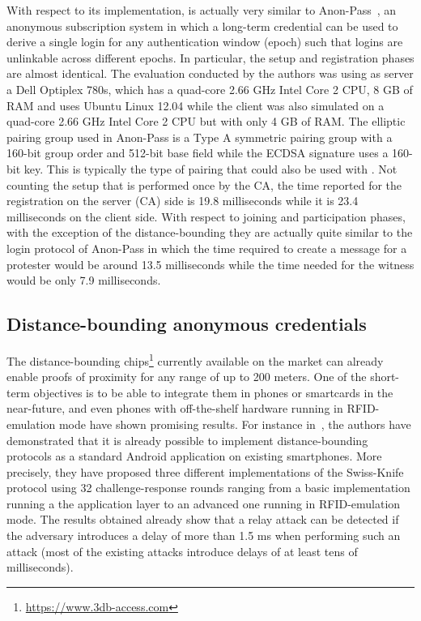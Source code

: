 With respect to its implementation, \CROCUS is actually very similar to Anon-Pass~\cite{AnonPass}, an anonymous subscription system in which a long-term credential can be used to derive a single login for any authentication window (\ie epoch) such that logins are unlinkable across different epochs. 
In particular, the setup and registration phases are almost identical. 
The evaluation conducted by the authors was using as server a Dell Optiplex 780s, which has a quad-core 2.66 GHz Intel Core 2 CPU, 8 GB of RAM and uses Ubuntu Linux 12.04 while the client was also simulated on a quad-core 2.66 GHz Intel Core 2 CPU but with only 4 GB of RAM.
The elliptic pairing group used in Anon-Pass is a Type A symmetric pairing group with a 160-bit group order and 512-bit base field while the ECDSA signature uses a 160-bit key.
This is typically the type of pairing that could also be used with \CROCUS.
Not counting the setup that is performed once by the CA, the time reported for the registration on the server (\ie CA) side is 19.8 milliseconds while it is 23.4 milliseconds on the client side.
With respect to joining and participation phases, with the exception of the distance-bounding they are actually quite similar to the login protocol of Anon-Pass in which the time required to create a message for a protester would be around 13.5 milliseconds while the time needed for the witness would be only 7.9 milliseconds.

\subsection{Distance-bounding anonymous credentials}
The distance-bounding chips\footnote{\url{https://www.3db-access.com}} currently available on the market can already enable proofs of proximity for any range of up to 200 meters.
One of the short-term objectives is to be able to integrate them in phones or smartcards in the near-future, and even phones with off-the-shelf hardware running in RFID-emulation mode have shown promising results.
For instance in~\cite{DBonSmartphones}, the authors have demonstrated that it is already possible to implement distance-bounding protocols as a standard Android application on existing smartphones. 
More precisely, they have proposed three different implementations of the Swiss-Knife protocol using 32 challenge-response rounds ranging from a basic implementation running a the application layer to an advanced one running in RFID-emulation mode. 
The results obtained already show that a relay attack can be detected if the adversary introduces a delay of more than 1.5 ms when performing such an attack (most of the existing attacks introduce delays of at least tens of milliseconds).

